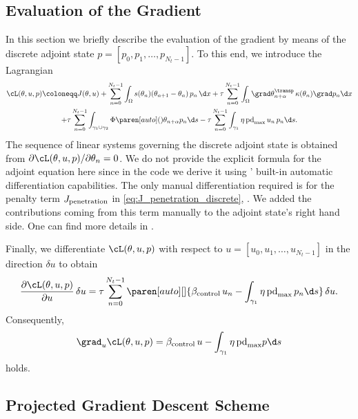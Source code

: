 \subsection{Evaluation of the Gradient}

In this section we briefly describe the evaluation of the gradient by means of the discrete adjoint state $p = [p_0, p_1, \ldots, p_{N_t-1}]$.
To this end, we introduce the Lagrangian 
\begin{multline} \label{eq:lagrange}
	\cL(\theta,u,p) \coloneqq
	J(\theta,u)
	+
	\sum_{n=0}^{N_t-1}\int_{\Omega} s(\theta_n) (\theta_{n+1}-\theta_n) \, p_n \, \d x
	+ 
	\tau \sum_{n=0}^{N_t-1}\int_{\Omega} \grad \theta_{n+\alpha}^\transp \, \kappa(\theta_n) \grad p_n \d x
	\\
	+ 
	\tau \sum_{n=0}^{N_t-1}\int_{\gamma_1 \cup \gamma_2} \Phi \paren[auto](){\theta_{n+\alpha}} p_n \d s
	- 
	\tau \sum_{n=0}^{N_t-1}\int_{\gamma_1} \eta \, \text{pd}_{\max} \, u_n \, p_n \d s.
\end{multline}
The sequence of linear systems governing the discrete adjoint state is obtained from $\partial \cL(\theta,u,p)/\partial \theta_n = 0$.
We do not provide the explicit formula for the adjoint equation here since in the code we derive it using \fenics' built-in automatic differentiation capabilities.
The only manual differentiation required is for the penalty term $J_\textup{penetration}$ in \eqref{eq:J_penetration_discrete}, .
We added the contributions coming from this term manually to the adjoint state's right hand side.
One can find more details in \cite[\texttt{optipuls.core}]{optipuls_github}.

Finally, we differentiate $\cL(\theta,u,p)$ with respect to $u = [u_0, u_1, \ldots, u_{N_t-1}]$ in the direction $\delta u$ to obtain
\begin{equation}
	\frac{\partial \cL(\theta,u,p)}{\partial u} \, \delta u
	=
	\tau \sum_{n=0}^{N_t-1}
	\paren[auto][]{\beta_\textup{control} \, u_n - \int_{\gamma_1} \eta \, \text{pd}_{\max} \, p_n \d s} \, \delta u
	.
\end{equation}
Consequently,
\begin{equation} \label{eq:gradient}
	\grad_u \cL(\theta, u, p) 
	= 
	\beta_\textup{control}\, u - \int_{\gamma_1} \eta \, \text{pd}_{\max} p \d s
\end{equation}
holds.


\subsection{Projected Gradient Descent Scheme}

